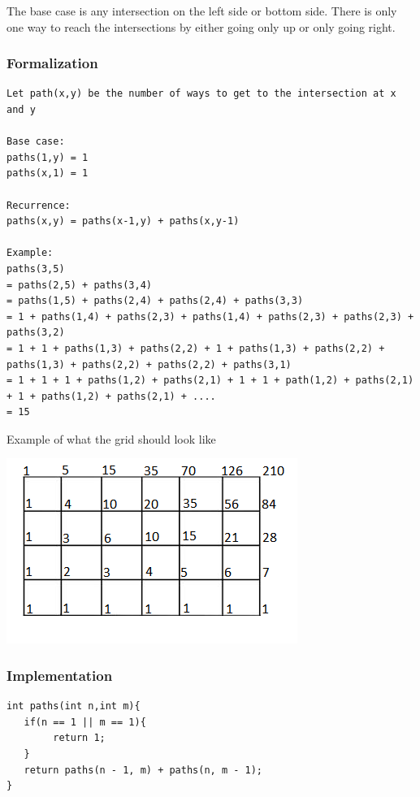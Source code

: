 \documentclass[11pt,oneside]{book}
\makeatletter
\def\maxwidth#1{\ifdim\Gin@nat@width>#1 #1\else\Gin@nat@width\fi}
\makeatother
\begin{document}
The base case is any intersection on the left side or bottom side. There is only one way to reach the intersections by either going only up or only going right.

\subsubsection{Formalization}

\begin{lstlisting}
Let path(x,y) be the number of ways to get to the intersection at x and y

Base case:
paths(1,y) = 1
paths(x,1) = 1

Recurrence:
paths(x,y) = paths(x-1,y) + paths(x,y-1)

Example:
paths(3,5)
= paths(2,5) + paths(3,4)
= paths(1,5) + paths(2,4) + paths(2,4) + paths(3,3)
= 1 + paths(1,4) + paths(2,3) + paths(1,4) + paths(2,3) + paths(2,3) + paths(3,2)
= 1 + 1 + paths(1,3) + paths(2,2) + 1 + paths(1,3) + paths(2,2) + paths(1,3) + paths(2,2) + paths(2,2) + paths(3,1)
= 1 + 1 + 1 + paths(1,2) + paths(2,1) + 1 + 1 + path(1,2) + paths(2,1) + 1 + paths(1,2) + paths(2,1) + ....
= 15
\end{lstlisting}

Example of what the grid should look like

\vspace{5px}\includegraphics[width=\maxwidth{\textwidth}]{recursion_grid2.png}

\subsubsection{Implementation}

\begin{lstlisting}
int paths(int n,int m){
   if(n == 1 || m == 1){
        return 1;
   }
   return paths(n - 1, m) + paths(n, m - 1);
}
\end{lstlisting}
\end{document}
